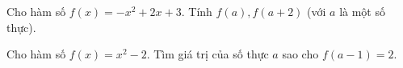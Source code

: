 
\begin{bt}%
	Cho hàm số $f(x)=-x^2+2x+3$. Tính $f(a), f(a+2)$ (với $a$ là một số thực).
\end{bt}

\begin{bt}%
	Cho hàm số $f(x)=x^2-2$. Tìm giá trị của số thực $a$ sao cho $f(a-1)=2$.
\end{bt}

